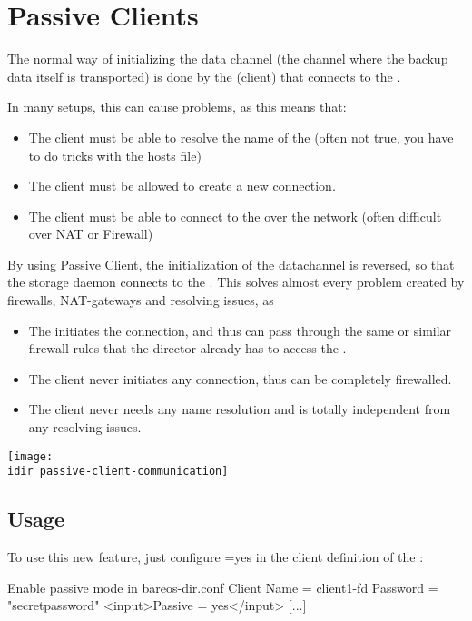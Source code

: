 \section{Passive Clients}
\label{PassiveClient}

The normal way of initializing the data channel (the channel where the backup data itself is transported)
is done by the \bareosFd (client) that connects to the \bareosSd.

In many setups, this can cause problems, as this means that:
\begin{itemize}
    \item The client must be able to resolve the name of the \bareosSd (often not true, you have to do tricks with the hosts file)
    \item The client must be allowed to create a new connection.
    \item The client must be able to connect to the \bareosSd over the network (often difficult over NAT or Firewall)
\end{itemize}

By using Passive Client, the initialization of the datachannel is reversed, so that the storage daemon connects to the \bareosFd.
This solves almost every problem created by firewalls, NAT-gateways and resolving issues, as
\begin{itemize}
    \item The \bareosSd initiates the connection, and thus can pass through the same or similar firewall rules that the director already has to access the \bareosFd.
    \item The client never initiates any connection, thus can be completely firewalled.
    \item The client never needs any name resolution and is totally independent from any resolving issues.
\end{itemize}

\begin{center}
\texttt{[image: \\idir passive-client-communication]}
\end{center}

\subsection{Usage}

To use this new feature, just configure  =yes in the client definition of the \bareosDir:
\begin{bconfig}{Enable passive mode in bareos-dir.conf}
Client {
   Name = client1-fd
   Password = "secretpassword"
   <input>Passive = yes</input>
   [...]
}
\end{bconfig}

